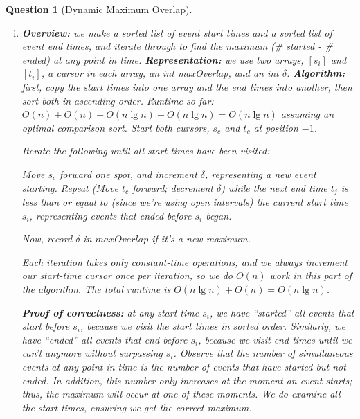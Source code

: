 \documentclass{article}
\newtheorem{ques}{Question}
\renewcommand{\b}[1]{\textbf{#1}}
\begin{document}
\begin{ques}[Dynamic Maximum Overlap]
\begin{enumerate}[i.]
  \item %
  \b{Overview:} we make a sorted list of event start times and a sorted list of event end times, and iterate through to find the maximum (# started - # ended) at any point in time.
  \b{Representation:} we use two arrays, $[s_i]$ and $[t_i]$, a cursor in each array, an int maxOverlap, and an int $\delta$.
  \b{Algorithm:} first, copy the start times into one array and the end times into another, then sort both in ascending order. Runtime so far: $O(n) + O(n) + O(n\lg n) + O(n\lg n) = O(n\lg n)$ assuming an optimal comparison sort. Start both cursors, $s_c$ and $t_c$ at position $-1$.

  Iterate the following until all start times have been visited:

  Move $s_c$ forward one spot, and increment $\delta$, representing a new event starting. Repeat (Move $t_c$ forward; decrement $\delta$) while the next end time $t_j$ is less than or equal to (since we're using open intervals) the current start time $s_i$, representing events that ended before $s_i$ began.

  Now, record $\delta$ in $maxOverlap$ if it's a new maximum.

  Each iteration takes only constant-time operations, and we always increment our start-time cursor once per iteration, so we do $O(n)$ work in this part of the algorithm. The total runtime is $O(n\lg n) + O(n) = O(n\lg n)$.

  \b{Proof of correctness:} at any start time $s_i$, we have ``started'' all events that start before $s_i$, because we visit the start times in sorted order. Similarly, we have ``ended'' all events that end before $s_i$, because we visit end times until we can't anymore without surpassing $s_i$. Observe that the number of simultaneous events at any point in time is the number of events that have started but not ended. In addition, this number only increases at the moment an event starts; thus, the maximum will occur at one of these moments. We do examine all the start times, ensuring we get the correct maximum.


\end{enumerate}
\end{ques}
\end{document}
